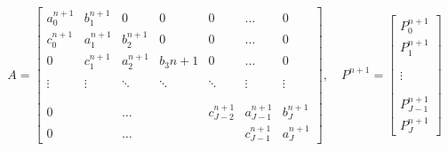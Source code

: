 \begin{equation}
A = 
\begin{bmatrix}
	a_0^{n+1} & b_1^{n+1} & 0                & 0                & 0        & \dots                                 & 0        \\
	c_0^{n+1} & a_1^{n+1} & b_2^{n+1} & 0                & 0        & \dots                                 & 0        \\
	0                & c_1^{n+1} & a_2^{n+1} & b_3{n+1}   & 0        & \dots                                 & 0        \\
			     &                   &                   &                  &           &                                         &           \\       
	\vdots         & \vdots         & \ddots         & \ddots         & \ddots & \vdots                              & \vdots \\
			     &                   &                   &                  &           &                                         &           \\
			     &                   &                   &                  &           &                                         &           \\
	0                &                   & \dots           &                   &  c_{J-2}^{n+1} & a_{J-1}^{n+1}  & b_J^{n+1} \\
	0                &                   & \dots           &                   &                         &  c_{J-1}^{n+1} & a_J^{n+1}
\end{bmatrix}
,\quad P^{n+1} =
\begin{bmatrix}
P_0^{n+1}       \\
P_1^{n+1}	     \\
                        \\
                        \\
\vdots               \\
                        \\
                        \\
P_{J-1}^{n+1} \\
P_J^{n+1}
\end{bmatrix}
\end{equation}

